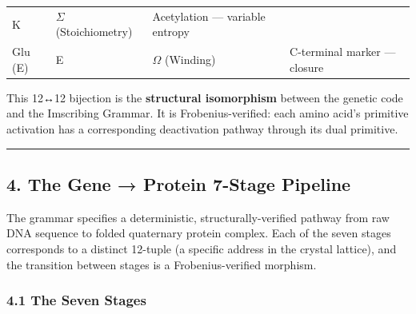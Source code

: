 \documentclass[12pt,a4paper]{article}
\begin{document}
\begin{longtable}[]{@{}llll@{}}
\begin{minipage}[t]{0.17\columnwidth}
K\strut
\end{minipage} & \begin{minipage}[t]{0.36\columnwidth}\raggedright
\(\Sigma\) (Stoichiometry)\strut
\end{minipage} & \begin{minipage}[t]{0.15\columnwidth}\raggedright
Acetylation --- variable entropy\strut
\end{minipage}\tabularnewline
\begin{minipage}[t]{0.20\columnwidth}\raggedright
Glu (E)\strut
\end{minipage} & \begin{minipage}[t]{0.17\columnwidth}\raggedright
E\strut
\end{minipage} & \begin{minipage}[t]{0.36\columnwidth}\raggedright
\(\Omega\) (Winding)\strut
\end{minipage} & \begin{minipage}[t]{0.15\columnwidth}\raggedright
C-terminal marker --- closure\strut
\end{minipage}\tabularnewline
\bottomrule
\end{longtable}

This 12↔12 bijection is the \textbf{structural isomorphism} between the
genetic code and the Imscribing Grammar. It is Frobenius-verified: each
amino acid's primitive activation has a corresponding deactivation
pathway through its dual primitive.

\begin{center}\rule{0.5\linewidth}{0.5pt}\end{center}

\hypertarget{the-gene-protein-7-stage-pipeline}{%
\subsection{4. The Gene → Protein 7-Stage
Pipeline}\label{the-gene-protein-7-stage-pipeline}}

The grammar specifies a deterministic, structurally-verified pathway
from raw DNA sequence to folded quaternary protein complex. Each of the
seven stages corresponds to a distinct 12-tuple (a specific address in
the crystal lattice), and the transition between stages is a
Frobenius-verified morphism.

\hypertarget{the-seven-stages}{%
\subsubsection{4.1 The Seven Stages}\label{the-seven-stages}}
\end{document}
